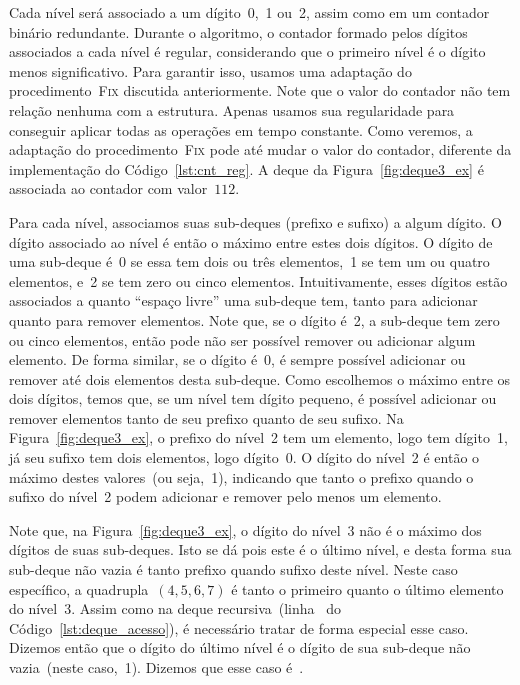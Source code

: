\documentclass[../../main.tex]{subfiles}
\begin{document}
Cada nível será associado a um dígito~0,~1 ou~2, assim como em um contador binário redundante. Durante o algoritmo, o contador formado pelos dígitos associados a cada nível é regular, considerando que o primeiro nível é o dígito menos significativo. Para garantir isso, usamos uma adaptação do procedimento~\textsc{Fix} discutida anteriormente. Note que o valor do contador não tem relação nenhuma com a estrutura. Apenas usamos sua regularidade para conseguir aplicar todas as operações em tempo constante. Como veremos, a adaptação do procedimento~\textsc{Fix} pode até mudar o valor do contador, diferente da implementação do Código~\ref{lst:cnt_reg}. A deque da Figura~\ref{fig:deque3_ex} é associada ao contador com valor~$112$.

Para cada nível, associamos suas sub-deques (prefixo e sufixo) a algum dígito. O dígito associado ao nível é então o máximo entre estes dois dígitos. O dígito de uma sub-deque é~0 se essa tem dois ou três elementos,~1 se tem um ou quatro elementos, e~2 se tem zero ou cinco elementos. Intuitivamente, esses dígitos estão associados a quanto ``espaço livre'' uma sub-deque tem, tanto para adicionar quanto para remover elementos. Note que, se o dígito é~2, a sub-deque tem zero ou cinco elementos, então pode não ser possível remover ou adicionar algum elemento. De forma similar, se o dígito é~0, é sempre possível adicionar ou remover até dois elementos desta sub-deque. Como escolhemos o máximo entre os dois dígitos, temos que, se um nível tem dígito pequeno, é possível adicionar ou remover elementos tanto de seu prefixo quanto de seu sufixo. Na Figura~\ref{fig:deque3_ex}, o prefixo do nível~2 tem um elemento, logo tem dígito~1, já seu sufixo tem dois elementos, logo dígito~0. O dígito do nível~2 é então o máximo destes valores~(ou seja,~1), indicando que tanto o prefixo quando o sufixo do nível~2 podem adicionar e remover pelo menos um elemento.

Note que, na Figura~\ref{fig:deque3_ex}, o dígito do nível~3 não é o máximo dos dígitos de suas sub-deques. Isto se dá pois este é o último nível, e desta forma sua sub-deque não vazia é tanto prefixo quando sufixo deste nível. Neste caso específico, a quadrupla~$(4, 5, 6, 7)$ é tanto o primeiro quanto o último elemento do nível~3. Assim como na deque recursiva~(linha~ do Código~\ref{lst:deque_acesso}), é necessário tratar de forma especial esse caso. Dizemos então que o dígito do último nível é o dígito de sua sub-deque não vazia~(neste caso,~1). Dizemos que esse caso é~.
\end{document}
